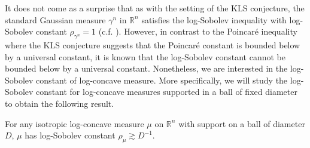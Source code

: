 It does not come as a surprise that as with the setting of the KLS conjecture, the standard Gaussian measure 
\(\gamma^n\) in \(\mathbb{R}^n\) satisfies the log-Sobolev inequality with log-Sobolev constant 
\(\rho_{\gamma^n} = 1\) (c.f. \cite{Gross_1975}). However, in contrast to the Poincaré inequality where 
the KLS conjecture suggests that the Poincaré constant is bounded below by a universal constant, it is known 
\cite{Lee_2016} that the log-Sobolev constant cannot be bounded below by a universal constant. Nonetheless, we are 
interested in the log-Sobolev constant of log-concave measure. More specifically, we will study the 
log-Sobolev constant for log-concave measures supported in a ball of fixed diameter to obtain the 
following result.

\begin{theorem}\label{thm:Lee_Vempala}
  For any isotropic log-concave measure \(\mu\) on \(\mathbb{R}^n\) with support on a ball of diameter \(D\), 
  \(\mu\) has log-Sobolev constant \(\rho_\mu \gtrsim D^{-1}\).
\end{theorem}







